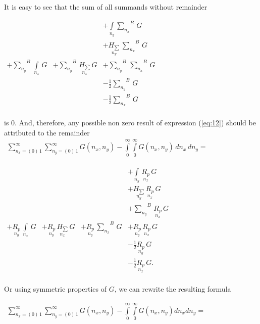 \documentclass[twoside, 10pt, ptm]{article}
\begin{document}
\begin{multicols}{2}
    It is easy to see that the sum of all summands without remainder

    \(\begin{array}{llll}  \,&  \,&  + \int\limits_{n_y}^{}{\sum\limits_{n_x}^{}}^{B}\,G \\  \,&  \,&  + \underset{n_y}{H_{\sum}}\,{\sum\limits_{n_x}^{}}^{B}\,G \\  + {\sum\limits_{n_y}^{}}^{B}\,\int\limits_{n_x}^{}\,G &  + {\sum\limits_{n_y}^{}}^{B}\,\underset{n_x}{H_{\sum}}\,G &  + {\sum\limits_{n_y}^{}}^{B}\,{\sum\limits_{n_x}^{}}^{B}\,G\\  \,&  \,&  - \frac{1}{2}{\sum\limits_{n_y}^{}}^{B}\,G \\  \,&  \,&  - \frac{1}{2}{\sum\limits_{n_x}^{}}^{B}\,G \\ \end{array}\)

    is 0. And, therefore, any possible non zero result of expression (\ref{eq:12}) should be attributed to the remainder
\noindent
    \(\begin{array}{r} \sum\limits_{n_x=\left(0\right)\,1}^{\infty} \sum\limits_{n_y=\left(0\right)\,1}^{\infty} G\left(n_x, n_y\right) - \int\limits_{0}^{\infty} \int\limits_{0}^{\infty} G\left(n_x, n_y\right)\,d{n_x}\,d{n_y} = \end{array}\)

    \(\begin{array}{llll}  \,&  \,&  \,&  + \int\limits_{n_y}^{}\,\underset{n_x}{R_{p}}\,G \\  \,&  \,&  \,&  + \underset{n_y}{H_{\sum}}\,\underset{n_x}{R_{p}}\,G \\  \,&  \,&  \,&  + {\sum\limits_{n_y}^{}}^{B}\,\underset{n_x}{R_{p}}\,G \\  + \underset{n_y}{R_{p}}\,\int\limits_{n_x}^{}\,G &  + \underset{n_y}{R_{p}}\,\underset{n_x}{H_{\sum}}\,G &  + \underset{n_y}{R_{p}}\,{\sum\limits_{n_x}^{}}^{B}\,G &  + \underset{n_y}{R_{p}}\,\underset{n_x}{R_{p}}\,G \\  \,&  \,&  \,&  - \frac{1}{2}\underset{n_y}{R_{p}}\,G \\  \,&  \,&  \,&  - \frac{1}{2}\underset{n_x}{R_{p}}\,G. \\ \end{array}\)

    Or using symmetric properties of \(G\), we can rewrite the resulting formula

\noindent
    \(\begin{array}{r} \sum\limits_{n_x=\left(0\right)\,1}^{\infty} \sum\limits_{n_y=\left(0\right)\,1}^{\infty} G\left(n_x, n_y\right) - \int\limits_{0}^{\infty} \int\limits_{0}^{\infty} G\left(n_x, n_y\right) d{n_x} d{n_y} = \end{array}\)


\end{multicols}
\end{document}
